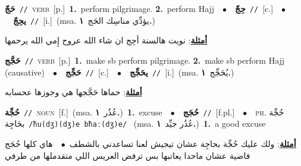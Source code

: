 \documentclass[10pt,a4paper,twoside]{article} %
\begin{document}
\begin{multicols}{2}
{\setlength\topsep{0pt}\textbf{\foreignlanguage{arabic}{حَجّ}}\ {\color{gray}\texttt{//}\color{black}}\ \textsc{verb}\ [p.]\ \textbf{1.}~perform pilgrimage.  \textbf{2.}~perform Hajj\ \ $\bullet$\ \ \setlength\topsep{0pt}\textbf{\foreignlanguage{arabic}{حِجّ}}\ {\color{gray}\texttt{//}\color{black}}\ [c.]\ \ $\bullet$\ \ \setlength\topsep{0pt}\textbf{\foreignlanguage{arabic}{يحِجّ}}\ {\color{gray}\texttt{//}\color{black}}\ [i.]\ \color{gray}(msa. \foreignlanguage{arabic}{يؤدِّي مناسِك الحَج}~\foreignlanguage{arabic}{\textbf{١.}})\color{black}\  \begin{flushright}\color{gray}\foreignlanguage{arabic}{\textbf{\underline{\foreignlanguage{arabic}{أمثلة}}}: نويت هالسنة أحِج ان شاء الله عروح إِمي الله يرحمها}\end{flushright}\color{black}} \vspace{2mm}

{\setlength\topsep{0pt}\textbf{\foreignlanguage{arabic}{حَجَّج}}\ {\color{gray}\texttt{//}\color{black}}\ \textsc{verb}\ [p.]\ \textbf{1.}~make sb perform pilgrimage.  \textbf{2.}~make sb perform Hajj (causative)\ \ $\bullet$\ \ \setlength\topsep{0pt}\textbf{\foreignlanguage{arabic}{حَجِّج}}\ {\color{gray}\texttt{//}\color{black}}\ [c.]\ \ $\bullet$\ \ \setlength\topsep{0pt}\textbf{\foreignlanguage{arabic}{يحَجِّج}}\ {\color{gray}\texttt{//}\color{black}}\ [i.]\ \color{gray}(msa. \foreignlanguage{arabic}{يُحَجِّج}~\foreignlanguage{arabic}{\textbf{١.}})\color{black}\  \begin{flushright}\color{gray}\foreignlanguage{arabic}{\textbf{\underline{\foreignlanguage{arabic}{أمثلة}}}: حماها حَجَّجها هي وجوزها عحسابه}\end{flushright}\color{black}} \vspace{2mm}

{\setlength\topsep{0pt}\textbf{\foreignlanguage{arabic}{حُجِّة}}\ {\color{gray}\texttt{//}\color{black}}\ \textsc{noun}\ [f.]\ \color{gray}(msa. \foreignlanguage{arabic}{عُذُر}~\foreignlanguage{arabic}{\textbf{١.}})\color{black}\ \textbf{1.}~excuse\ \ $\bullet$\ \ \setlength\topsep{0pt}\textbf{\foreignlanguage{arabic}{حُجَج}}\ {\color{gray}\texttt{//}\color{black}}\ [f.pl.]\ \ $\bullet$\ \ \textsc{ph.} \color{gray} \foreignlanguage{arabic}{حُجِّة بحَاجِة}\color{black}\ {\color{gray}\texttt{/{\sffamily ħu(dʒ)(dʒ)e bħaː(dʒ)e}/}\color{black}}\ \color{gray} (msa. \foreignlanguage{arabic}{عُذُر جيِّد}~\foreignlanguage{arabic}{\textbf{١.}})\color{black}\ \textbf{1.}~a good excuse\  \begin{flushright}\color{gray}\foreignlanguage{arabic}{\textbf{\underline{\foreignlanguage{arabic}{أمثلة}}}: ولك عليك حُجِّة بحاجِة عشان تيجيش لعنا تساعدني بالشطف\ $\bullet$\ \  هاي كلها حُجَج فاضية عشان ماحدا يعاتبها بس ترفض العريس اللي متقدملها من طرفي}\end{flushright}\color{black}} \vspace{2mm}


\end{multicols}
\end{document}
